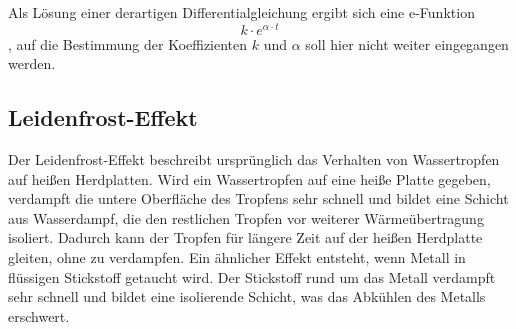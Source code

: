 Als Lösung einer derartigen Differentialgleichung ergibt sich eine e-Funktion 
\begin{equation}
k \cdot e^{\alpha \cdot t}
\label{form:konvektion2}
\end{equation}
, auf die Bestimmung der Koeffizienten $k$ und $\alpha$ soll hier nicht weiter eingegangen werden. 

\subsection{Leidenfrost-Effekt}
Der Leidenfrost-Effekt beschreibt ursprünglich das Verhalten von Wassertropfen auf heißen Herdplatten. Wird ein Wassertropfen auf eine heiße Platte gegeben, verdampft die untere Oberfläche des Tropfens sehr schnell und bildet eine Schicht aus Wasserdampf, die den restlichen Tropfen vor weiterer Wärmeübertragung isoliert. Dadurch kann der Tropfen für längere Zeit auf der heißen Herdplatte gleiten, ohne zu verdampfen.
Ein ähnlicher Effekt entsteht, wenn Metall in flüssigen Stickstoff getaucht wird. Der Stickstoff rund um das Metall verdampft sehr schnell und bildet eine isolierende Schicht, was das Abkühlen des Metalls erschwert.
